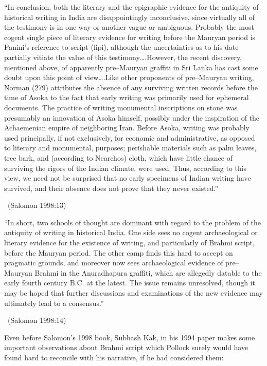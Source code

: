 \begin{myquote}
“In conclusion, both the literary and the epigraphic evidence for the antiquity of historical writing in India are disappointingly inconclusive, since virtually all of the testimony is in one way or another vague or ambiguous. Probably the most cogent single piece of literary evidence for writing before the Mauryan period is Panini’s reference to script (lipi), although the uncertainties as to his date partially vitiate the value of this testimony….However, the recent discovery, mentioned above, of apparently pre–Mauryan graffiti in Sri Lanka has cast some doubt upon this point of view….Like other proponents of pre–Mauryan writing, Norman (279) attributes the absence of any surviving written records before the time of Asoka to the fact that early writing was primarily used for ephemeral documents. The practice of writing monumental inscriptions on stone was presumably an innovation of Asoka himself, possibly under the inspiration of the Achaemenian empire of neighboring Iran. Before Asoka, writing was probably used principally, if not exclusively, for economic and administrative, as opposed to literary and monumental, purposes; perishable materials such as palm leaves, tree bark, and (according to Nearchos) cloth, which have little chance of surviving the rigors of the Indian climate, were used. Thus, according to this view, we need not be surprised that no early specimens of Indian writing have survived, and their absence does not prove that they never existed.” 

~\hfill (Salomon 1998:13)
\end{myquote}

\begin{myquote}
“In short, two schools of thought are dominant with regard to the problem of the antiquity of writing in historical India. One side sees no cogent archaeological or literary evidence for the existence of writing, and particularly of Brahmi script, before the Mauryan period. The other camp finds this hard to accept on pragmatic grounds, and moreover now sees archaeological evidence of pre–Mauryan Brahmi in the Anuradhapura graffiti, which are allegedly datable to the early fourth century B.C. at the latest. The issue remains unresolved, though it may be hoped that further discussions and examinations of the new evidence may ultimately lead to a consensus.” 

~\hfill (Salomon 1998:14)
\end{myquote}

Even before Salomon’s 1998 book, Subhash Kak, in his 1994 paper makes some important observations about Brahmi script which Pollock surely would have found hard to reconcile with his narrative, if he had considered them:

